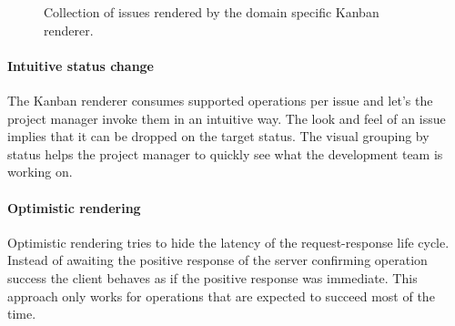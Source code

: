 \begin{figure}[!htb]
  \caption{Collection of issues rendered by the domain specific Kanban renderer.}
  \label{fig:kanban}
\end{figure}

\paragraph{Intuitive status change}
The Kanban renderer consumes supported operations per issue and let's the project manager invoke them in an intuitive way. The look and feel of an issue implies that it can be dropped on the target status. The visual grouping by status helps the project manager to quickly see what the development team is working on.

\paragraph{Optimistic rendering}
Optimistic rendering tries to hide the latency of the request-response life cycle. Instead of awaiting the positive response of the server confirming operation success the client behaves as if the positive response was immediate. This approach only works for operations that are expected to succeed most of the time.

